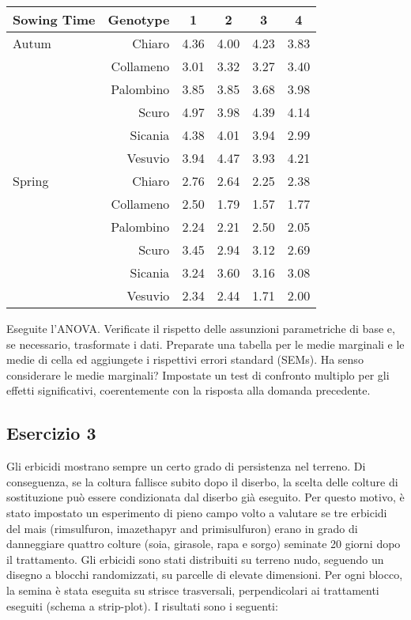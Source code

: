 \documentclass[a4paper,12pt,oneside]{book}
\begin{document}
\begin{longtable}[]{@{}lrcccc@{}}
\toprule
Sowing Time & Genotype & 1 & 2 & 3 & 4 \\
\midrule
\endhead
Autum & Chiaro & 4.36 & 4.00 & 4.23 & 3.83 \\
& Collameno & 3.01 & 3.32 & 3.27 & 3.40 \\
& Palombino & 3.85 & 3.85 & 3.68 & 3.98 \\
& Scuro & 4.97 & 3.98 & 4.39 & 4.14 \\
& Sicania & 4.38 & 4.01 & 3.94 & 2.99 \\
& Vesuvio & 3.94 & 4.47 & 3.93 & 4.21 \\
Spring & Chiaro & 2.76 & 2.64 & 2.25 & 2.38 \\
& Collameno & 2.50 & 1.79 & 1.57 & 1.77 \\
& Palombino & 2.24 & 2.21 & 2.50 & 2.05 \\
& Scuro & 3.45 & 2.94 & 3.12 & 2.69 \\
& Sicania & 3.24 & 3.60 & 3.16 & 3.08 \\
& Vesuvio & 2.34 & 2.44 & 1.71 & 2.00 \\
\bottomrule
\end{longtable}

Eseguite l'ANOVA. Verificate il rispetto delle assunzioni parametriche di base e, se necessario, trasformate i dati. Preparate una tabella per le medie marginali e le medie di cella ed aggiungete i rispettivi errori standard (SEMs). Ha senso considerare le medie marginali? Impostate un test di confronto multiplo per gli effetti significativi, coerentemente con la risposta alla domanda precedente.

\hypertarget{esercizio-3-6}{%
\subsection{Esercizio 3}\label{esercizio-3-6}}

Gli erbicidi mostrano sempre un certo grado di persistenza nel terreno. Di conseguenza, se la coltura fallisce subito dopo il diserbo, la scelta delle colture di sostituzione può essere condizionata dal diserbo già eseguito. Per questo motivo, è stato impostato un esperimento di pieno campo volto a valutare se tre erbicidi del mais (rimsulfuron, imazethapyr and primisulfuron) erano in grado di danneggiare quattro colture (soia, girasole, rapa e sorgo) seminate 20 giorni dopo il trattamento. Gli erbicidi sono stati distribuiti su terreno nudo, seguendo un disegno a blocchi randomizzati, su parcelle di elevate dimensioni. Per ogni blocco, la semina è stata eseguita su strisce trasversali, perpendicolari ai trattamenti eseguiti (schema a strip-plot). I risultati sono i seguenti:
\end{document}
